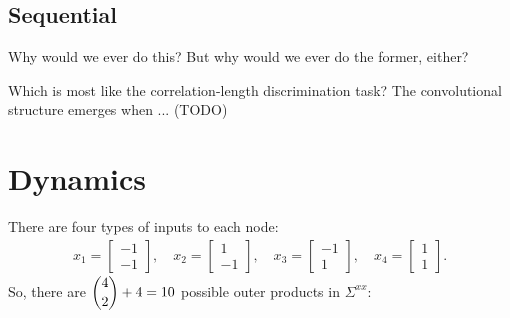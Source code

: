 \documentclass{article}
\begin{document}
\subsection*{Sequential}
Why would we ever do this?
But why would we ever do the former, either?

Which is most like the correlation-length discrimination task?
The convolutional structure emerges when 
... (TODO)

\section{Dynamics}
There are four types of inputs to each node:
\begin{align}
  x_1 = \begin{bmatrix} -1 \\ -1 \end{bmatrix}, \quad
  x_2 = \begin{bmatrix} 1 \\ -1 \end{bmatrix}, \quad
  x_3 = \begin{bmatrix} -1 \\ 1 \end{bmatrix}, \quad
  x_4 = \begin{bmatrix} 1 \\ 1 \end{bmatrix}.
\end{align}
So, there are $\dbinom{4}{2} + 4 = 10$ possible outer products in $\Sigma^{xx}$:
\end{document}
